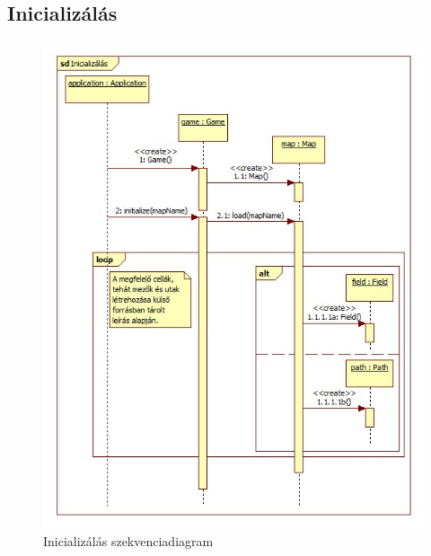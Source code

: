 \subsection{Inicializálás}
\begin{figure}[H]
\begin{center}
\includegraphics[width=17cm]{chapters/chapter04/images/Inicializalas.jpg}
\caption{Inicializálás szekvenciadiagram}
\label{fig:Inicializálás}
\end{center}
\end{figure}

